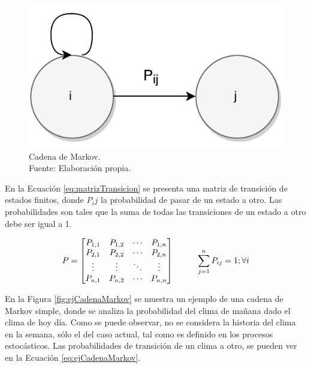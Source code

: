 \begin{figure}[ht!]
  \centering
    \includegraphics[scale=0.6]{images/CadenaMarkov.pdf}
  \caption[Cadena de Markov.]{Cadena de Markov.\\Fuente: Elaboraci\'on propia.}
  \label{fig:cadenaMarkov}
\end{figure}

En la Ecuaci\'on \ref{eq:matrizTransicion} se presenta una matriz de transici\'on de estados finitos, \normalsize{donde} $P_ij$ \normalsize{la probabilidad de pasar de un estado a otro. Las probabilidades son tales que la suma de todas las transiciones de un estado a otro debe ser igual a 1.}

\begin{equation} \label{eq:matrizTransicion}
	P =
	\begin{bmatrix}
		P_{1,1} & P_{1,2} & \cdots & P_{1,n} \\
		P_{2,1} & P_{2,2} & \cdots & P_{2,n} \\
		\vdots  & \vdots  & \ddots & \vdots  \\
		P_{n,1} & P_{n,2} & \cdots & P_{n,n} \\
	\end{bmatrix}
	\hspace*{1cm} \sum_{j=1}^{n} P_{ij} = 1 ; \forall i
\end{equation}

En la Figura \ref{fig:ejCadenaMarkov} se muestra un ejemplo de una cadena de Markov simple, donde se analiza la probabilidad del clima de ma\~nana dado el clima de hoy d\'ia. Como se puede observar, no se considera la historia del clima en la semana, s\'olo el del caso actual, tal como es definido en los procesos estoc\'asticos. Las probabilidades \normalsize{de transici\'on} de un clima a otro, se pueden ver en la Ecuaci\'on \ref{eq:ejCadenaMarkov}.

